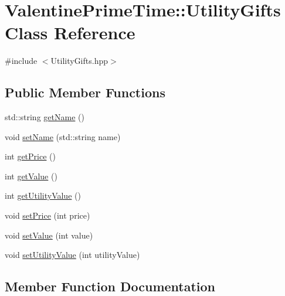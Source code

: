 \hypertarget{classValentinePrimeTime_1_1UtilityGifts}{}\section{Valentine\+Prime\+Time\+:\+:Utility\+Gifts Class Reference}
\label{classValentinePrimeTime_1_1UtilityGifts}


{\ttfamily \#include $<$Utility\+Gifts.\+hpp$>$}

\subsection*{Public Member Functions}
\begin{DoxyCompactItemize}
\item 
std\+::string \hyperlink{classValentinePrimeTime_1_1UtilityGifts_ab7c0f6d1039f9538799ba1b22714faa5}{get\+Name} ()
\item 
void \hyperlink{classValentinePrimeTime_1_1UtilityGifts_a5aaa1f705891f3c366562734fed521f0}{set\+Name} (std\+::string name)
\item 
int \hyperlink{classValentinePrimeTime_1_1UtilityGifts_ad34b24de164c428f731af29a22d12a15}{get\+Price} ()
\item 
int \hyperlink{classValentinePrimeTime_1_1UtilityGifts_ac34d7c7b5ed35cb404fc8529a6fb729c}{get\+Value} ()
\item 
int \hyperlink{classValentinePrimeTime_1_1UtilityGifts_a0b37e5a1db260db816629207ef2c12bd}{get\+Utility\+Value} ()
\item 
void \hyperlink{classValentinePrimeTime_1_1UtilityGifts_a7f0482011cae8b12914edc27efb58507}{set\+Price} (int price)
\item 
void \hyperlink{classValentinePrimeTime_1_1UtilityGifts_af32a80eb7464c61e603836f5202567e0}{set\+Value} (int value)
\item 
void \hyperlink{classValentinePrimeTime_1_1UtilityGifts_a529944ba5402f69bcc08442c6ee47e22}{set\+Utility\+Value} (int utility\+Value)
\end{DoxyCompactItemize}


\subsection{Member Function Documentation}
